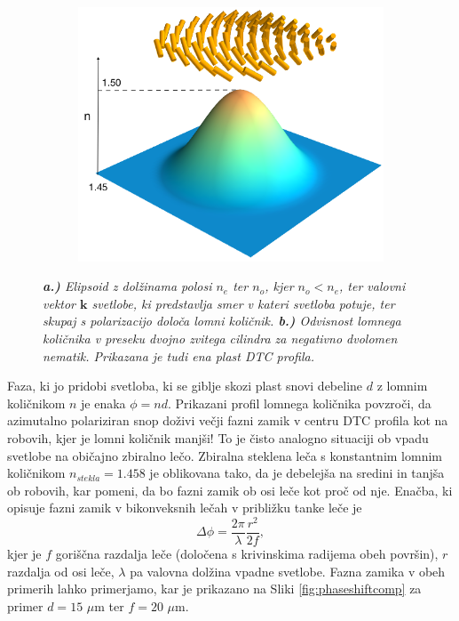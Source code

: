 \documentclass[longbibliography,slovene,a4paper,12pt]{book}
\begin{document}
\begin{figure}[h!]
\begin{subfigure}[b]{0.55\textwidth}
	\includegraphics[width=\textwidth]{slike/nematic_refractive_xyz.png}
	\label{fig:dtcrefractiveindex3d}
	\end{subfigure}
	\caption{\emph{\textbf{a.)} Elipsoid z dolžinama polosi $n_e$ ter $n_o$, kjer $n_o<n_e$, ter valovni vektor $\mathbf{k}$ svetlobe, ki predstavlja smer v kateri svetloba potuje, ter skupaj s polarizacijo določa lomni količnik. \textbf{b.)} Odvisnost lomnega količnika v preseku dvojno zvitega cilindra za negativno dvolomen nematik. Prikazana je tudi ena plast DTC profila.}}
\end{figure}

Faza, ki jo pridobi svetloba, ki se giblje skozi plast snovi debeline $d$ z lomnim količnikom $n$ je enaka $\phi = nd$. Prikazani profil lomnega količnika povzroči, da azimutalno polariziran snop doživi večji fazni zamik v centru DTC profila kot na robovih, kjer je lomni količnik manjši! To je čisto analogno  situaciji ob vpadu svetlobe na običajno zbiralno lečo. Zbiralna steklena leča s konstantnim lomnim količnikom $n_{stekla} = 1.458$ je oblikovana tako, da je debelejša na sredini in tanjša ob robovih, kar pomeni, da bo fazni zamik ob osi leče kot proč od nje. Enačba, ki opisuje fazni zamik v bikonveksnih lečah v približku tanke leče je
\begin{equation}
\Delta \phi = \frac{2\pi}{\lambda} \frac{r^2}{2f},
\end{equation}
kjer je $f$ goriščna razdalja leče (določena s krivinskima radijema obeh površin), $r$ razdalja od osi leče, $\lambda$ pa valovna dolžina vpadne svetlobe. Fazna zamika v obeh primerih lahko primerjamo, kar je prikazano na Sliki \ref{fig:phaseshiftcomp} za primer $d = 15$ $\mu$m ter $f = 20$ $\mu$m.\\
\end{document}
